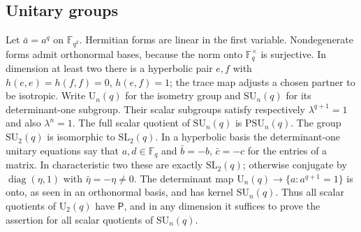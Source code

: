 \documentclass[11pt]{article}
\theoremstyle{definition}
\newcommand{\F}{\mathbb F}
\newcommand{\Pp}{\mathsf P}
\newcommand{\SL}{\mathrm{SL}}
\newcommand{\SU}{\mathrm{SU}}
\newcommand{\PSU}{\mathrm{PSU}}
\newcommand{\U}{\mathrm U}
\newcommand{\diag}{\operatorname{diag}}
\begin{document}
\subsection{Unitary groups}
Let $\bar a=a^q$ on $\F_{q^2}$. Hermitian forms are linear in the first variable. Nondegenerate forms admit orthonormal bases, because the norm onto $\F_q^\times$ is surjective. In dimension at least two there is a hyperbolic pair $e,f$ with $h(e,e)=h(f,f)=0$, $h(e,f)=1$; the trace map adjusts a chosen partner to be isotropic. Write $\U_n(q)$ for the isometry group and $\SU_n(q)$ for its determinant-one subgroup. Their scalar subgroups satisfy respectively $\lambda^{q+1}=1$ and also $\lambda^n=1$. The full scalar quotient of $\SU_n(q)$ is $\PSU_n(q)$.
The group $\SU_2(q)$ is isomorphic to $\SL_2(q)$. In a hyperbolic basis the determinant-one unitary equations say that $a,d\in\F_q$ and $\bar b=-b$, $\bar c=-c$ for the entries of a matrix. In characteristic two these are exactly $\SL_2(q)$; otherwise conjugate by $\diag(\eta,1)$ with $\bar\eta=-\eta\ne0$. The determinant map $\U_n(q)\to\{a:a^{q+1}=1\}$ is onto, as seen in an orthonormal basis, and has kernel $\SU_n(q)$. Thus all scalar quotients of $\U_2(q)$ have $\Pp$, and in any dimension it suffices to prove the assertion for all scalar quotients of $\SU_n(q)$.
\end{document}
